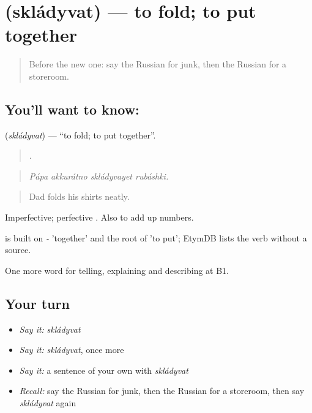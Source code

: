 \section[\texorpdfstring{\ru{складывать} (skládyvat)}{складывать (skládyvat)}]{ (skládyvat) — to fold; to put together}

\label{lesson:RU-C531-skladyvat}



\begin{quote}
Before the new one: say the Russian for junk, then the Russian for a storeroom.
\end{quote}

\subsection*{You'll want to know: }
\textbf{} (\emph{skládyvat}) — \textquotedblleft{}to fold; to put together\textquotedblright{}.

\begin{quote}
   .
\end{quote}

\begin{quote}
\emph{Pápa akkurátno skládyvayet rubáshki.}
\end{quote}

\begin{quote}
Dad folds his shirts neatly.
\end{quote}

Imperfective; perfective . Also to add up numbers.

\begin{cousinweb}
\emph{} is built on \emph{-} 'together' and the root of \emph{} 'to put'; EtymDB lists the verb without a source.
\end{cousinweb}

\begin{grammarlens}[title={What you've built}]
One more word for telling, explaining and describing at B1.
\end{grammarlens}

\subsection*{Your turn}
\begin{itemize}
\raggedright
  \item \emph{Say it:} \emph{skládyvat}
  \item \emph{Say it:} \emph{skládyvat}, once more
  \item \emph{Say it:} a sentence of your own with \emph{skládyvat}
  \item \emph{Recall:} say the Russian for junk, then the Russian for a storeroom, then say \emph{skládyvat} again
\end{itemize}

